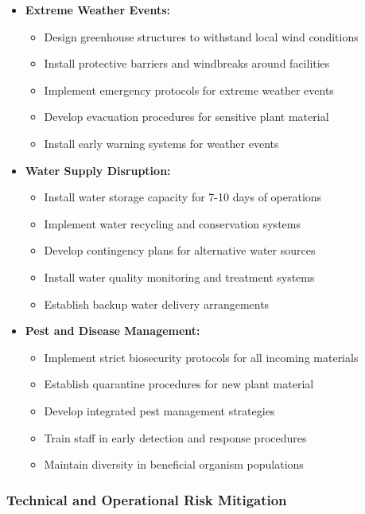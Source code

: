 \begin{itemize}
    \item \textbf{Extreme Weather Events:}
    \begin{itemize}
        \item Design greenhouse structures to withstand local wind conditions
        \item Install protective barriers and windbreaks around facilities
        \item Implement emergency protocols for extreme weather events
        \item Develop evacuation procedures for sensitive plant material
        \item Install early warning systems for weather events
    \end{itemize}
    
    \item \textbf{Water Supply Disruption:}
    \begin{itemize}
        \item Install water storage capacity for 7-10 days of operations
        \item Implement water recycling and conservation systems
        \item Develop contingency plans for alternative water sources
        \item Install water quality monitoring and treatment systems
        \item Establish backup water delivery arrangements
    \end{itemize}
    
    \item \textbf{Pest and Disease Management:}
    \begin{itemize}
        \item Implement strict biosecurity protocols for all incoming materials
        \item Establish quarantine procedures for new plant material
        \item Develop integrated pest management strategies
        \item Train staff in early detection and response procedures
        \item Maintain diversity in beneficial organism populations
    \end{itemize}
\end{itemize}

\subsubsection{Technical and Operational Risk Mitigation}

